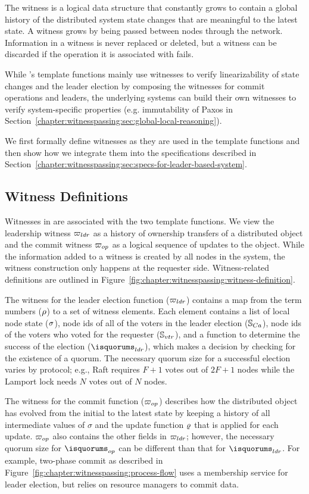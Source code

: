 The witness is a logical data structure that constantly grows to contain a global
history of the distributed system state changes that are meaningful to the
latest state. A witness grows by being passed between nodes through the network.
Information in a witness is never replaced or deleted, but a witness can
be discarded if the operation it is associated with fails.

While \sysname{}'s template functions mainly use witnesses to verify
linearizability of state changes and the leader election by composing the 
witnesses for commit operations and leaders, the underlying systems can
build their own witnesses to verify system-specific properties (e.g. immutability
of Paxos in Section~\ref{chapter:witnesspassing:sec:global-local-reasoning}).

We first formally define witnesses as they are used in the template functions
and then show how we integrate them into the specifications described in Section~\ref{chapter:witnesspassing:sec:specs-for-leader-based-system}.

\subsection{Witness Definitions} 
\label{chapte:witnesspassing:subsec:witness-definition}
Witnesses in \sysname{} are associated with the two template functions.
We view the leadership witness ${\varpi_{ldr}}$ as a history of ownership transfers
of a distributed object and the commit witness ${\varpi_{op}}$ as
a logical sequence of updates to the object. While the information added to a
witness is created by all nodes in the system, the witness construction only
happens at the requester side. Witness-related definitions are outlined in
Figure~\ref{fig:chapter:witnesspassing:witness-definition}.

The witness for the leader election function (${\varpi_{ldr}}$) contains a map
from the term numbers ($\rho$) to a set of witness elements.
Each element contains a list of local node state ($\sigma$), node ids
of all of the voters in the leader election ($\mathbb{S}_{Ca}$), node ids of the voters who voted
for the requester ($\mathbb{S}_{vtr}$), and a function to determine the success of the
election ($\isquorums_{ldr}$), which makes a decision by checking for the existence of a
quorum. The necessary quorum size for a successful election varies
by protocol; e.g., Raft requires $F + 1$ votes out of $2F + 1$
nodes while the Lamport lock needs $N$ votes out of $N$ nodes.

The witness for the commit function (${\varpi_{op}}$) describes how the distributed
object has evolved from the initial to the latest state by keeping a
history of all intermediate values of $\sigma$ and the update function
$\varrho$ that is applied for each update. ${\varpi_{op}}$ also contains
the other fields in ${\varpi_{ldr}}$; however, the necessary quorum size for $\isquorums_{op}$
can be different than that for $\isquorums_{ldr}$. For example,
two-phase commit as described in Figure~\ref{fig:chapter:witnesspassing:process-flow} uses
a membership service for leader election, but relies on resource managers to
commit data.

